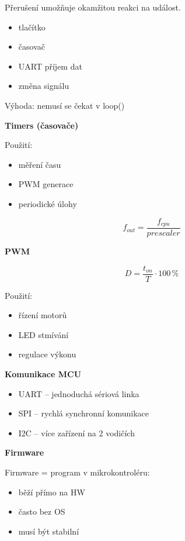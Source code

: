 \documentclass[a4paper,10pt]{article}
\begin{document}
\begin{vysvetlenibox}
Přerušení umožňuje okamžitou reakci na událost.

\begin{itemize}
\item tlačítko
\item časovač
\item UART příjem dat
\item změna signálu
\end{itemize}

 Výhoda: nemusí se čekat v loop()

\textbf{Timers (časovače)}

Použití:
\begin{itemize}
\item měření času
\item PWM generace
\item periodické úlohy
\end{itemize}

\[
f_{out} = \frac{f_{cpu}}{prescaler}
\]

\textbf{PWM}

\begin{vzorcebox}
\[
D = \frac{t_{on}}{T} \cdot 100\,\%
\]
\end{vzorcebox}

Použití:
\begin{itemize}
\item řízení motorů
\item LED stmívání
\item regulace výkonu
\end{itemize}

\textbf{Komunikace MCU}

\begin{itemize}
\item UART – jednoduchá sériová linka
\item SPI – rychlá synchronní komunikace
\item I2C – více zařízení na 2 vodičích
\end{itemize}

\textbf{Firmware}

Firmware = program v mikrokontroléru:
\begin{itemize}
\item běží přímo na HW
\item často bez OS
\item musí být stabilní
\end{itemize}

\end{vysvetlenibox}
\end{document}
